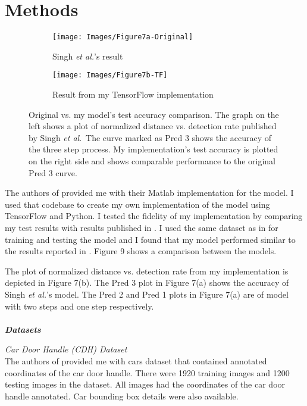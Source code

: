 \documentclass [11pt,letterpaper ,twoside ,openany ]{report}
\begin{document}
    \chapter{Methods}
    \doublespacing

    \begin{wrapfigure}{l}[9mm]{0.55\textwidth}
        \begin{subfigure}[b]{\linewidth}
            \texttt{[image: Images/Figure7a-Original]}
            \caption{Singh \textit{et al.}'s result \cite{Singh_2016_CVPR}}
        \end{subfigure}
        \begin{subfigure}[b]{\linewidth}
            \texttt{[image: Images/Figure7b-TF]}
            \caption{Result from my TensorFlow implementation}
        \end{subfigure}
        \caption{Original vs. my model's test accuracy comparison. The graph on the left shows a plot of normalized distance vs. detection rate published by Singh \textit{et al}.\ The curve marked as Pred 3 shows the accuracy of the three step process. My implementation's test accuracy is plotted on the right side and shows comparable performance to the original Pred 3 curve.}
        \label{fig:compare.}
    \end{wrapfigure}       


    The authors of \cite{Singh_2016_CVPR} provided me with their Matlab implementation for the model. I used that codebase to create my own implementation of the model using TensorFlow and Python. I tested the fidelity of my implementation by comparing my test results with results published in \cite{Singh_2016_CVPR}. I used the same dataset as in \cite{Singh_2016_CVPR} for training and testing the model and I found that my model performed similar to the results reported in \cite{Singh_2016_CVPR}. Figure 9 shows a comparison between the models.

    The plot of normalized distance vs. detection rate from my implementation is depicted in Figure 7(b). The Pred 3 plot in Figure 7(a) shows the accuracy of Singh \textit{et al.}'s model. The Pred 2 and Pred 1 plots in Figure 7(a) are of model with two steps and one step respectively.\\\\

    \noindent
    \textbf{\textit{Datasets}}

    \noindent
    \textit{Car Door Handle (CDH) Dataset}\\
    The authors of \cite{Singh_2016_CVPR} provided me with cars dataset that contained annotated coordinates of the car door handle. There were 1920 training images and 1200 testing images in the dataset. All images had the coordinates of the car door handle annotated. Car bounding box details were also available.\\
\end{document}
